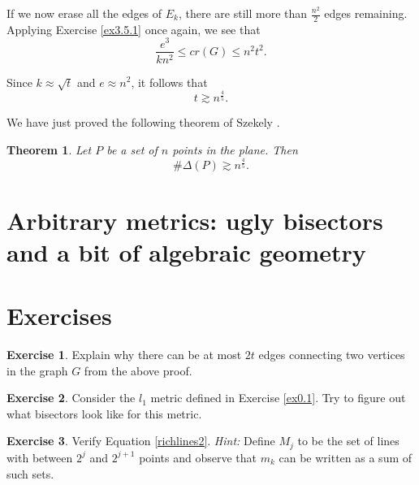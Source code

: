 \documentclass[]{stml-l}
\numberwithin{equation}{chapter}
\theoremstyle{plain}
\newtheorem{theorem}[equation]{Theorem}
\theoremstyle{definition}
\newtheorem{exercise}{Exercise}[chapter]
\theoremstyle{remark}
\begin{document}
If we now erase all the edges of $E_k$, there are still more than
$\frac{n^2}{2}$ edges remaining. Applying Exercise \ref{ex3.5.1}
once again, we see that
\begin{equation}
\frac{e^3}{kn^2} \leq cr(G) \leq n^2t^2.
\end{equation}



Since $k \approx \sqrt{t}$ and $e \approx n^2$, it follows that
\begin{equation}
t \gtrsim n^{\frac{4}{5}}.
\end{equation}



We have just proved the following theorem of Szekely \cite{Sze}.

\begin{theorem} \label{szekely.thm}
Let $P$ be a set of $n$ points in the plane. Then
\begin{equation}
\# \Delta(P) \gtrsim n^{\frac{4}{5}}.
\end{equation}
\end{theorem}

\section{Arbitrary metrics: ugly bisectors and a bit of algebraic geometry} 


\section*{Exercises}

\begin{exercise} \label{ex4.1}
Explain why there can be at most $2t$ edges connecting
two vertices in the graph $G$ from the above proof.
\end{exercise}

\begin{exercise} \label{ex4.2}
Consider the $l_1$ metric defined in Exercise \ref{ex0.1}.  Try to
figure out what bisectors look like for this metric.
\end{exercise}

\begin{exercise} \label{ex4.3}
Verify Equation \ref{richlines2}.  {\it Hint:}  Define $M_j$ to be the set of lines with between $2^j$ and $2^{j+1}$ points and observe that $m_k$ can be written as a sum of such sets.
\end{exercise}
\end{document}
